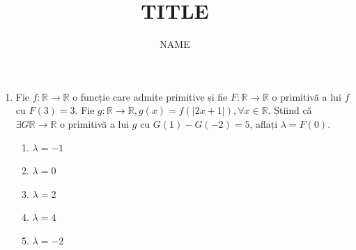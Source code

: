 \documentclass{article}
\title{TITLE}
\author{NAME}
\begin{document}
\begin{enumerate}
    
\item Fie $f: \mathbb{R} \to \mathbb{R}$ o funcție care admite primitive și fie $F: \mathbb{R} \to \mathbb{R}$
o primitivă a lui $f$ cu $F(3) = 3$. Fie $g: \mathbb{R} \to \mathbb{R}, g(x) = f(|2x+1|), \forall x \in \mathbb{R}$.
Știind că $\exists G \mathbb{R} \to \mathbb{R}$ o primitivă a lui $g$ cu $G(1) - G(-2) = 5$, aflați $\lambda = F(0)$.

\begin{enumerate}
    \item $\lambda = -1$
    \item $\lambda = 0$
    \item $\lambda = 2$
    \item $\lambda = 4$
    \item $\lambda = -2$
\end{enumerate}

\end{enumerate}
\end{document}
